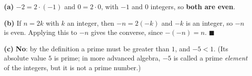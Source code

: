 \textbf{(a)} $-2=2\cdot(-1)$ and $0=2\cdot0$, with $-1$ and $0$ integers, so \textbf{both are even}.

\textbf{(b)} If $n=2k$ with $k$ an integer, then $-n=2(-k)$ and $-k$ is an integer, so $-n$ is even. Applying this to $-n$ gives the converse, since $-(-n)=n$. $\blacksquare$

\textbf{(c)} \textbf{No}: by the definition a prime must be greater than $1$, and $-5<1$. (Its absolute value $5$ is prime; in more advanced algebra, $-5$ is called a prime \emph{element} of the integers, but it is not a prime number.)
